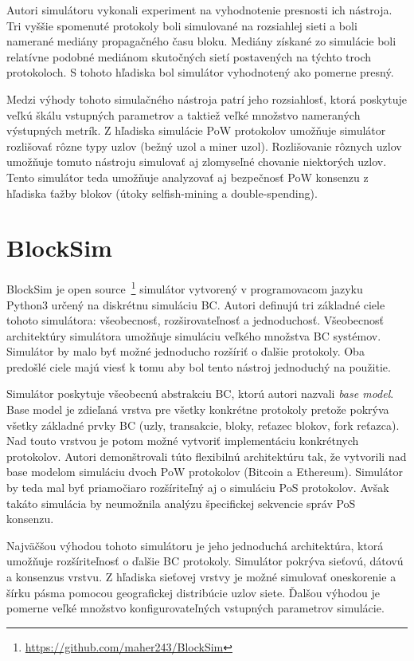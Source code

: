 Autori simulátoru vykonali experiment na vyhodnotenie presnosti ich nástroja. Tri vyššie spomenuté protokoly boli simulované na rozsiahlej sieti a boli namerané mediány propagačného času bloku. Mediány získané zo simulácie boli relatívne podobné mediánom skutočných sietí postavených na týchto troch protokoloch. S tohoto hľadiska bol simulátor vyhodnotený ako pomerne presný.~\cite{btcSimulatorWp}

Medzi výhody tohoto simulačného nástroja patrí jeho rozsiahlosť, ktorá poskytuje veľkú škálu vstupných parametrov a taktiež veľké množstvo nameraných výstupných metrík. Z hľadiska simulácie PoW protokolov umožňuje simulátor rozlišovať rôzne typy uzlov (bežný uzol a miner uzol). Rozlišovanie rôznych uzlov umožňuje tomuto nástroju simulovať aj zlomyseľné chovanie niektorých uzlov. Tento simulátor teda umožňuje analyzovať aj bezpečnosť PoW konsenzu z hľadiska ťažby blokov (útoky selfish-mining a double-spending).~\cite{fanPerfEval}

\section{BlockSim}\label{sec:blocksim}

BlockSim je open source~\footnote{\url{https://github.com/maher243/BlockSim}} simulátor vytvorený v programovacom jazyku Python3 určený na diskrétnu simuláciu BC. Autori definujú tri základné ciele tohoto simulátora: všeobecnosť, rozširovateľnosť a jednoduchosť. Všeobecnosť architektúry simulátora umožňuje simuláciu veľkého množstva BC systémov. Simulátor by malo byť možné jednoducho rozšíriť o ďalšie protokoly. Oba predošlé ciele majú viesť k tomu aby bol tento nástroj jednoduchý na použitie. 

Simulátor poskytuje všeobecnú abstrakciu BC, ktorú autori nazvali \textit{base model}. Base model je zdieľaná vrstva pre všetky konkrétne protokoly pretože pokrýva všetky základné prvky BC (uzly, transakcie, bloky, reťazec blokov, fork reťazca). Nad touto vrstvou je potom možné vytvoriť implementáciu konkrétnych protokolov. Autori demonštrovali túto flexibilnú architektúru tak, že vytvorili nad base modelom simuláciu dvoch PoW protokolov (Bitcoin a Ethereum). Simulátor by teda mal byť priamočiaro rozšíriteľný aj o simuláciu PoS protokolov. Avšak takáto simulácia by neumožnila analýzu špecifickej sekvencie správ PoS konsenzu.~\cite{blocksimWp}	

Najväčšou výhodou tohoto simulátoru je jeho jednoduchá architektúra, ktorá umožňuje rozšíriteľnosť o ďalšie BC protokoly. Simulátor pokrýva sieťovú, dátovú a konsenzus vrstvu. Z hľadiska sieťovej vrstvy je možné simulovať oneskorenie a šírku pásma pomocou geografickej distribúcie uzlov siete. Ďalšou výhodou je pomerne veľké množstvo konfigurovateľných vstupných parametrov simulácie. 

